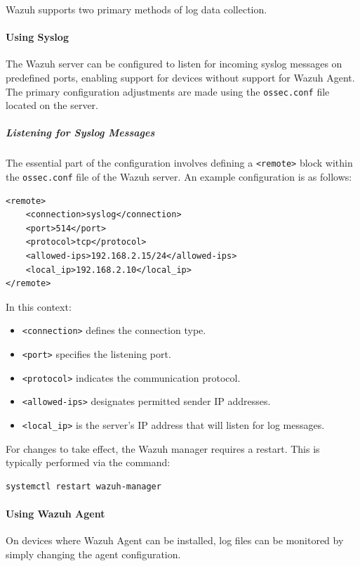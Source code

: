 Wazuh supports two primary methods of log data collection.

\paragraph{Using Syslog}
The Wazuh server can be configured to listen for incoming syslog messages on predefined ports, enabling support for devices without support for Wazuh Agent. The primary configuration adjustments are made using the \texttt{ossec.conf} file located on the server.

\subparagraph{Listening for Syslog Messages}
The essential part of the configuration involves defining a \texttt{<remote>} block within the \texttt{ossec.conf} file of the Wazuh server. An example configuration is as follows:

\begin{verbatim}
<remote>
    <connection>syslog</connection>
    <port>514</port>
    <protocol>tcp</protocol>
    <allowed-ips>192.168.2.15/24</allowed-ips>
    <local_ip>192.168.2.10</local_ip>
</remote>
\end{verbatim}

In this context:
\begin{itemize}
    \item \texttt{<connection>} defines the connection type.
    \item \texttt{<port>} specifies the listening port.
    \item \texttt{<protocol>} indicates the communication protocol.
    \item \texttt{<allowed-ips>} designates permitted sender IP addresses.
    \item \texttt{<local\_ip>} is the server's IP address that will listen for log messages.
\end{itemize}

For changes to take effect, the Wazuh manager requires a restart. This is typically performed via the command:

\begin{verbatim}
systemctl restart wazuh-manager
\end{verbatim}

\paragraph{Using Wazuh Agent}
On devices where Wazuh Agent can be installed, log files can be monitored by simply changing the agent configuration.

